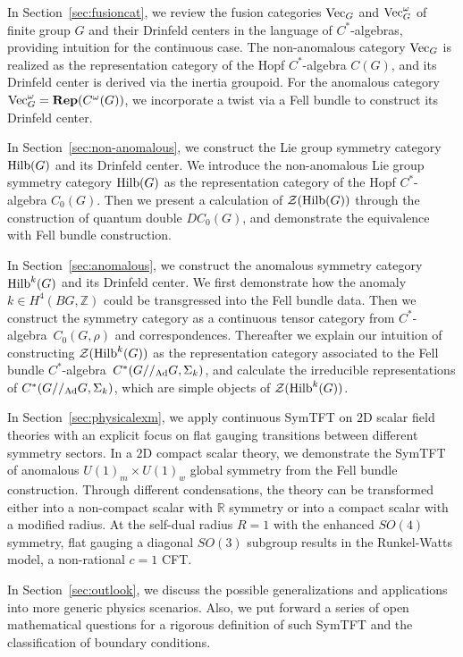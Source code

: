 \documentclass[a4paper,11pt]{article}
\newcommand{\Rep}{\textbf{Rep}}
\def\bbZ{\mathbb{Z}}
\def\CZ{\mathcal{Z}}
\def\calg{$C^*$-algebra\ }
\def\hilb{{\rm Hilb}}
\def\vecg{{\rm Vec}_G}
\def\vecgo{{\rm Vec}_G^\omega}
\def\gmg{G//_{\rm Ad} G}
\begin{document}
In Section~\ref{sec:fusioncat}, we review the fusion categories $\vecg$ and $\vecgo$ of finite group $G$ and their Drinfeld centers in the language of $C^*$-algebras, providing intuition for the continuous case. The non-anomalous category $\vecg$ is realized as the representation category of the Hopf $C^*$-algebra $C(G)$, and its Drinfeld center is derived via the inertia groupoid. For the anomalous category $\vecgo = \Rep (C^\omega(G))$, we incorporate a twist via a Fell bundle to construct its Drinfeld center.

In Section~\ref{sec:non-anomalous}, we construct the Lie group symmetry category $\hilb(G)$ and its Drinfeld center. We introduce the non-anomalous Lie group symmetry category $\hilb(G)$ as the representation category of the Hopf $C^*$-algebra $C_0(G)$. Then we present a calculation of $\CZ(\hilb(G))$ through the construction of quantum double $DC_0(G)$, and demonstrate the equivalence with Fell bundle construction.

In Section~\ref{sec:anomalous}, we construct the anomalous symmetry category $\hilb^k(G)$ and its Drinfeld center. We first demonstrate how the anomaly $k\in H^4(BG,\bbZ)$ could be transgressed into the Fell bundle data. Then we construct the symmetry category as a continuous tensor category from \calg $C_0(G,\rho)$ and correspondences. Thereafter we explain our intuition of constructing $\CZ(\hilb^k(G))$ as the representation category associated to the Fell bundle \calg $C^*(\gmg,\Sigma_k)$, and calculate the irreducible representations of $C^*(\gmg,\Sigma_k)$, which are simple objects of $\CZ(\hilb^k(G))$.

In Section~\ref{sec:physicalexm}, we apply continuous SymTFT on $2$D scalar field theories with an explicit focus on flat gauging transitions between different symmetry sectors. In a $2$D compact scalar theory, we demonstrate the SymTFT of anomalous $U(1)_m \times U(1)_w$ global symmetry from the Fell bundle construction. Through different condensations, the theory can be transformed either into a non-compact scalar with $\mathbb{R}$ symmetry or into a compact scalar with a modified radius. At the self-dual radius $R=1$ with the enhanced $SO(4)$ symmetry, flat gauging a diagonal $SO(3)$ subgroup results in the Runkel-Watts model, a non-rational $c=1$ CFT.

In Section~\ref{sec:outlook}, we discuss the possible generalizations and applications into more generic physics scenarios. Also, we put forward a series of open mathematical questions for a rigorous definition of such SymTFT and the classification of boundary conditions.
\end{document}
